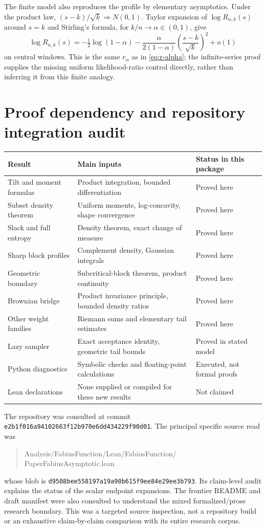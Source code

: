 \documentclass[11pt,a4paper]{article}
\numberwithin{equation}{section}
\theoremstyle{definition}
\theoremstyle{remark}
\begin{document}
The finite model also reproduces the profile by elementary
asymptotics. Under the product law,
$(s-k)/\sqrt k\Rightarrow N(0,1)$. Taylor expansion of
$\log R_{n,k}(s)$ around $s=k$ and Stirling's formula, for
$k/n\to\alpha\in(0,1)$, give
\[
 \log R_{n,k}(s)
 =-\tfrac12\log(1-\alpha)
   -\frac{\alpha}{2(1-\alpha)}\left(\frac{s-k}{\sqrt k}\right)^2
   +o(1)
\]
on central windows. This is the same $r_\alpha$ as in
\cref{eq:r-alpha}; the infinite-series proof supplies the missing
uniform likelihood-ratio control directly, rather than inferring
it from this finite analogy.

\section{Proof dependency and repository integration audit}
\label{app:audit}
\begin{center}\small
\begin{tabularx}{\linewidth}{@{}p{.25\linewidth}Xp{.22\linewidth}@{}}
\toprule
Result & Main inputs & Status in this package\\
\midrule
Tilt and moment formulas & Product integration, bounded differentiation & Proved here\\
Subset density theorem & Uniform moments, log-concavity, shape convergence & Proved here\\
Slack and full entropy & Density theorem, exact change of measure & Proved here\\
Sharp block profiles & Complement density, Gaussian integrals & Proved here\\
Geometric boundary & Subcritical-block theorem, product continuity & Proved here\\
Brownian bridge & Product invariance principle, bounded density ratios & Proved here\\
Other weight families & Riemann sums and elementary tail estimates & Proved here\\
Lazy sampler & Exact acceptance identity, geometric tail bounds & Proved in stated model\\
Python diagnostics & Symbolic checks and floating-point calculations & Executed, not formal proofs\\
Lean declarations & None supplied or compiled for these new results & Not claimed\\
\bottomrule
\end{tabularx}
\end{center}

The repository was consulted at commit
\nolinkurl{e2b1f016a94102663f12b970e6dd434229f90d01}. The principal
specific source read was
\begin{quote}\small\ttfamily
Analysis/FabiusFunction/Lean/FabiusFunction/\allowbreak
PaperFabiusAsymptotic.lean
\end{quote}
whose blob is
\nolinkurl{d9508bee558197a19a90b615f9ee84e29ee3b793}.
Its claim-level audit explains the status of the scalar endpoint
expansions. The frontier README and draft manifest were also
consulted to understand the mixed formalized/prose research
boundary. This was a targeted source inspection, not a repository
build or an exhaustive claim-by-claim comparison with its entire
research corpus.
\end{document}
